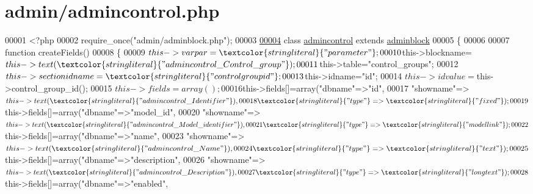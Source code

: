 \hypertarget{admincontrol_8php_source}{\section{admin/admincontrol.php}
}

\begin{DoxyCode}
00001 <?php
00002 require\_once(\textcolor{stringliteral}{"admin/adminblock.php"});
00003 
\hypertarget{admincontrol_8php_source_l00004}{}\hyperlink{classadmincontrol}{00004} \textcolor{keyword}{class }\hyperlink{classadmincontrol}{admincontrol} \textcolor{keyword}{extends} \hyperlink{classadminblock}{adminblock}
00005 \{  
00006 
00007   \textcolor{keyword}{function} createFields()
00008   \{
00009     $this->varpar=\textcolor{stringliteral}{"parameter"};
00010     $this->blockname=$this->text(\textcolor{stringliteral}{"admincontrol\_Control\_group"});
00011     $this->table=\textcolor{stringliteral}{"control\_groups"};
00012     $this->sectionidname=\textcolor{stringliteral}{"controlgroupid"};
00013     $this->idname=\textcolor{stringliteral}{"id"};
00014     $this->idvalue=$this->control\_group\_id();
00015     $this->fields=array();
00016     $this->fields[]=array(\textcolor{stringliteral}{"dbname"}=>\textcolor{stringliteral}{"id"},
00017                           \textcolor{stringliteral}{"showname"}=>$this->text(\textcolor{stringliteral}{"admincontrol\_Identifier"}),
00018                           \textcolor{stringliteral}{"type"}=>\textcolor{stringliteral}{"fixed"});
00019     $this->fields[]=array(\textcolor{stringliteral}{"dbname"}=>\textcolor{stringliteral}{"model\_id"},
00020                           \textcolor{stringliteral}{"showname"}=>$this->text(\textcolor{stringliteral}{"
      admincontrol\_Model\_identifier"}),
00021                           \textcolor{stringliteral}{"type"}=>\textcolor{stringliteral}{"model link"});
00022     $this->fields[]=array(\textcolor{stringliteral}{"dbname"}=>\textcolor{stringliteral}{"name"},
00023                           \textcolor{stringliteral}{"showname"}=>$this->text(\textcolor{stringliteral}{"admincontrol\_Name"}),
00024                           \textcolor{stringliteral}{"type"}=>\textcolor{stringliteral}{"text"});
00025     $this->fields[]=array(\textcolor{stringliteral}{"dbname"}=>\textcolor{stringliteral}{"description"},
00026                           \textcolor{stringliteral}{"showname"}=>$this->text(\textcolor{stringliteral}{"admincontrol\_Description"}),
00027                           \textcolor{stringliteral}{"type"}=>\textcolor{stringliteral}{"longtext"});
00028     $this->fields[]=array(\textcolor{stringliteral}{"dbname"}=>\textcolor{stringliteral}{"enabled"},

\end{DoxyCode}
